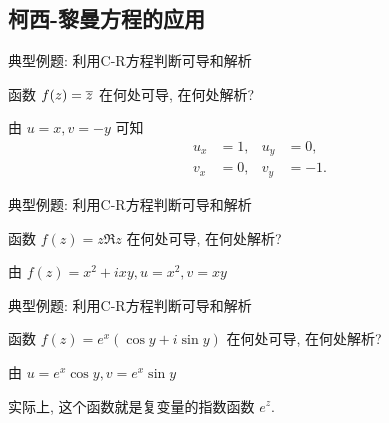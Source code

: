 \subsection{柯西-黎曼方程的应用}
\begin{frame}{典型例题: 利用C-R方程判断可导和解析}
\onslide<+->
\begin{example}
 函数 $f(z)=\overline z$ 在何处可导, 在何处解析?
\end{example}
\onslide<+->
\begin{solution*}
由 $u=x,v=-y$ 可知
\begin{align*}
u_x&=1,&u_y&=0,\\
v_x&=0,&v_y&=-1.
\end{align*}
\end{solution*}
\end{frame}


\begin{frame}{典型例题: 利用C-R方程判断可导和解析}
\onslide<+->
\begin{example}[续]
 函数 $f(z)=z\Re z$ 在何处可导, 在何处解析?
\end{example}
\onslide<+->
\begin{solution*}
由 $f(z)=x^2+ixy,u=x^2,v=xy$
%
\vspace{-\baselineskip}
\end{solution*}
\end{frame}


\begin{frame}{典型例题: 利用C-R方程判断可导和解析}
\onslide<+->
\begin{example}[续]
 函数 $f(z)=e^x(\cos y+i\sin y)$ 在何处可导, 在何处解析?
\end{example}
\onslide<+->
\begin{solution}
由 $u=e^x\cos y,v=e^x\sin y$
\vspace{-\baselineskip}
\end{solution}
\onslide<+->
实际上, 这个函数就是复变量的指数函数 $e^z$.
\end{frame}


